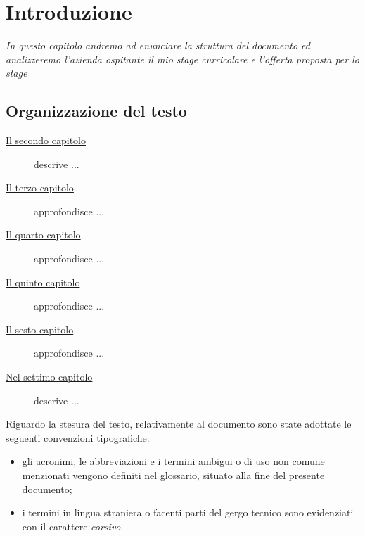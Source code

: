\chapter{Introduzione}
\label{cap:introduzione}

%
%
%
%
%
%
%

\emph{In questo capitolo andremo ad enunciare la struttura del documento ed analizzeremo l'azienda ospitante il mio stage curricolare e l'offerta proposta per lo stage }

\section{Organizzazione del testo}

\begin{description}
    \item[{\hyperref[cap:processi-metodologie]{Il secondo capitolo}}] descrive ...
    
    \item[{\hyperref[cap:descrizione-stage]{Il terzo capitolo}}] approfondisce ...
    
    \item[{\hyperref[cap:analisi-requisiti]{Il quarto capitolo}}] approfondisce ...
    
    \item[{\hyperref[cap:progettazione-codifica]{Il quinto capitolo}}] approfondisce ...
    
    \item[{\hyperref[cap:verifica-validazione]{Il sesto capitolo}}] approfondisce ...
    
    \item[{\hyperref[cap:conclusioni]{Nel settimo capitolo}}] descrive ...
\end{description}

Riguardo la stesura del testo, relativamente al documento sono state adottate le seguenti convenzioni tipografiche:
\begin{itemize}
	\item gli acronimi, le abbreviazioni e i termini ambigui o di uso non comune menzionati vengono definiti nel glossario, situato alla fine del presente documento;
	\item i termini in lingua straniera o facenti parti del gergo tecnico sono evidenziati con il carattere \emph{corsivo}.
\end{itemize}

